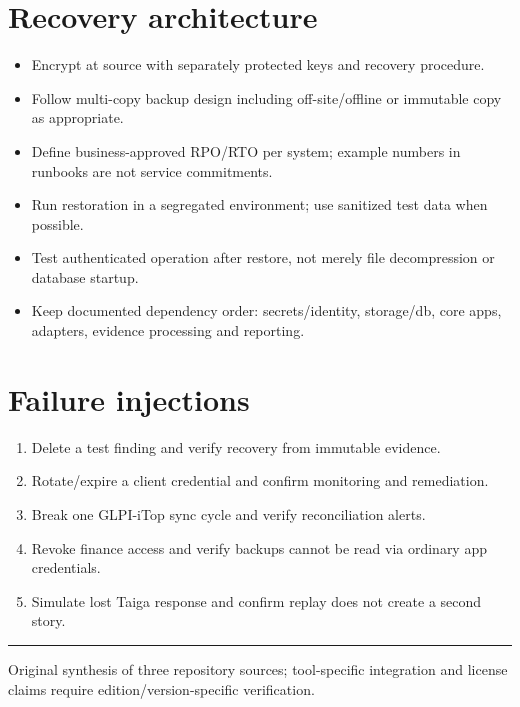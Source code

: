 \documentclass[10pt,letterpaper]{article}
\begin{document}
\section{Recovery architecture}
\begin{itemize}
\item Encrypt at source with separately protected keys and recovery procedure.
\item Follow multi-copy backup design including off-site/offline or immutable copy as appropriate.
\item Define business-approved RPO/RTO per system; example numbers in runbooks are not service commitments.
\item Run restoration in a segregated environment; use sanitized test data when possible.
\item Test authenticated operation after restore, not merely file decompression or database startup.
\item Keep documented dependency order: secrets/identity, storage/db, core apps, adapters, evidence processing and reporting.
\end{itemize}
\section{Failure injections}
\begin{enumerate}
\item Delete a test finding and verify recovery from immutable evidence.
\item Rotate/expire a client credential and confirm monitoring and remediation.
\item Break one GLPI-iTop sync cycle and verify reconciliation alerts.
\item Revoke finance access and verify backups cannot be read via ordinary app credentials.
\item Simulate lost Taiga response and confirm replay does not create a second story.
\end{enumerate}
\vfill\noindent\color{muted}\rule{\linewidth}{0.4pt}\par\scriptsize Original synthesis of three repository sources; tool-specific integration and license claims require edition/version-specific verification.\normalsize
\end{document}
